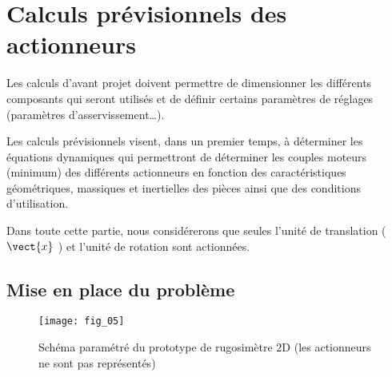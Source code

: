 \section{Calculs prévisionnels des actionneurs \label{sec:3}}


Les calculs d’avant projet doivent permettre de dimensionner les différents composants qui seront utilisés
et de définir certains paramètres de réglages (paramètres d’asservissement…).

Les calculs prévisionnels visent, dans un premier temps, à déterminer les équations dynamiques qui
permettront de déterminer les couples moteurs (minimum) des différents actionneurs en fonction des
caractéristiques géométriques, massiques et inertielles des pièces ainsi que des conditions d’utilisation.

Dans toute cette partie, nous considérerons que seules l'unité de translation ($\vect{x}$ ) et l’unité de rotation sont
actionnées.

\subsection{Mise en place du problème}

\begin{figure}[H]
\centering
\texttt{[image: fig\_05]}
\caption{\label{fig_05} Schéma paramétré du prototype de rugosimètre 2D (les actionneurs ne sont pas représentés)}
\end{figure}

